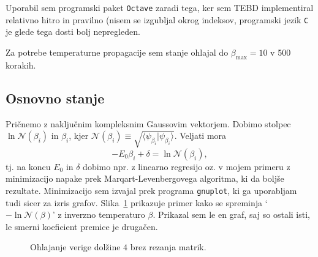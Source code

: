 \documentclass[12pt, a4 paper]{article}
\begin{document}
Uporabil sem programski paket \texttt{Octave} zaradi tega, ker sem TEBD implementiral relativno hitro in pravilno (nisem
se izgubljal okrog indeksov, programski jezik \texttt{C} je glede tega dosti bolj nepregleden.

Za potrebe temperaturne propagacije sem stanje ohlajal do $\beta_\text{max} = 10$ v 500 korakih.

\subsection{Osnovno stanje}

Pri\v cnemo z naklju\v cnim kompleksnim Gaussovim vektorjem. Dobimo stolpec $\ln\mathcal{N}(\beta_i)$ in $\beta_i$, kjer
$\mathcal{N}(\beta_i) \equiv \sqrt{\langle\psi_{\beta_i}|\psi_{\beta_i}\rangle}$. Veljati mora
\[
	-E_0\beta_i + \delta = \ln\mathcal{N}(\beta_i),
\]
tj. na koncu $E_0$ in $\delta$ dobimo npr. z linearno regresijo oz. v mojem primeru z minimizacijo napake prek
Marqart-Levenbergovega algoritma, ki da bolj\v se rezultate. Minimizacijo sem izvajal prek programa \texttt{gnuplot}, ki
ga uporabljam tudi sicer za izris grafov. Slika~\ref{energija2} prikazuje primer kako se spreminja `$-\ln\mathcal{N(\beta)}$' z
inverzno temperaturo $\beta$. Prikazal sem le en graf, saj so ostali isti, le smerni koeficient premice je druga\v cen.

\begin{figure}[H]\centering
	
	\caption{Ohlajanje verige dol\v zine $4$ brez rezanja matrik.}
	\label{energija2}
\end{figure}
\end{document}
